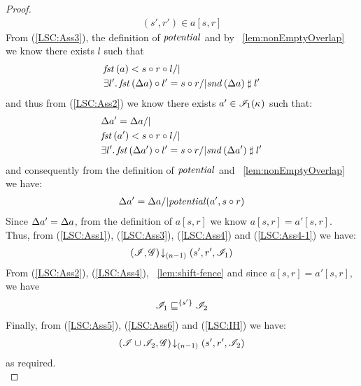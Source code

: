 \begin{lemma}
\begin{proof}
\begin{align}
	(s', r') \in a[s, r] \label{LSC:Ass4}
\end{align}
From (\ref{LSC:Ass3}), the definition of $\mathit{potential}$ and by \lem~\ref{lem:nonEmptyOverlap} we know there exists $l$ such that 
%
\begin{align*}
	& \fst{a} < s \composeL r \composeL l /| \null\\
	& \exsts{l'} \fst{\updateFP{a}} \composeL l' = s \composeL r /| \snd{\updateFP{a}} \compatible l'
\end{align*}
%
and thus from (\ref{LSC:Ass2}) we know there exists $a' \in \mathscr{I}_1(\kappa_{})$ such that: 
%
\begin{align*}
	& \updateFP{a'} = \updateFP{a} /|\\
	& \fst{a'} < s \composeL r \composeL l /| \null\\
	& \exsts{l'} \fst{\updateFP{a'}} \composeL l' = s \composeL r /| \snd{\updateFP{a'}} \compatible l'
\end{align*}
%
and consequently from the definition of $\mathit{potential}$ and \lem~\ref{lem:nonEmptyOverlap} we have: 
%
\begin{align}
	\Delta {a'} = \Delta {a} /| \mathit{potential}(a', s \circ r) \label{LSC:Ass4-1}
\end{align}
Since $\Delta {a'} = \Delta {a}$, from the definition of $a[s, r]$ we know $a[s, r] = a'[s, r]$. Thus, from (\ref{LSC:Ass1}), (\ref{LSC:Ass3}), (\ref{LSC:Ass4}) and (\ref{LSC:Ass4-1}) we have:
%
\begin{align}
	\left(\mathscr{I}, \mathscr{G}\right) \!\downarrow_{(n-1)} \left(s', r', \mathscr{I}_1\right) \label{LSC:Ass5}
\end{align}
%
From (\ref{LSC:Ass2}), (\ref{LSC:Ass4}), \lem~\ref{lem:shift-fence} and since $a[s, r] = a'[s, r]$, we have
%
\begin{align}
	\mathscr{I}_1 \sqsubseteq^{\{s'\}} \mathscr{I}_2 \label{LSC:Ass6}
\end{align}
%
Finally, from (\ref{LSC:Ass5}), (\ref{LSC:Ass6}) and (\ref{LSC:IH}) we have:
%
\begin{align*}
	\left(\mathscr{I} \cup \mathscr{I}_2, \mathscr{G}\right) \!\downarrow_{(n-1)} \left(s', r', \mathscr{I}_2\right)
\end{align*}
%
as required.\\
%
%
%
%


\end{proof}
\end{lemma}
